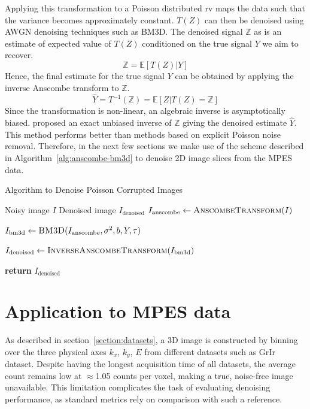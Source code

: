 Applying this transformation to a Poisson distributed \gls{rv} maps the data such that the variance becomes approximately constant. $T(Z)$ can then be denoised using \gls{AWGN} denoising techniques such as \gls{BM3D}. 
The denoised signal $\mathbb{Z}$ as is an estimate of expected value of $T(Z)$ conditioned on the true signal $Y$ we aim to recover.
\begin{equation}
    \mathbb{Z} = \mathbb{E}[T(Z) | Y]
\end{equation}
Hence, the final estimate for the true signal $Y$ can be obtained by applying the inverse Anscombe transform to $\mathbb{Z}$.
\begin{equation}
    \hat{Y} = T^{-1}(\mathbb{Z}) = \mathbb{E}[Z | T(Z) = \mathbb{Z}]
\end{equation}
Since the transformation is non-linear, an algebraic inverse is asymptotically biased. \citeauthor{makitaloOptimalInversionAnscombe2011} \cite{makitaloOptimalInversionAnscombe2011} proposed an exact unbiased inverse of $\mathbb{Z}$ giving the denoised estimate $\hat{Y}$. This method performs better than methods based on explicit Poisson noise removal. Therefore, in the next few sections we make use of the scheme described in Algorithm~\ref{alg:anscombe-bm3d} to denoise 2D image slices from the \gls{MPES} data.

\begin{algorithm}
    \caption{Algorithm to Denoise Poisson Corrupted Images}\label{alg:anscombe-bm3d}
    \begin{algorithmic}[1]
    \Require Noisy image $I$
    \Ensure Denoised image $I_{\text{denoised}}$
    \Statex
        \State $I_{\text{anscombe}} \gets \textsc{AnscombeTransform}(I)$
        
        \State $I_{\text{bm3d}} \gets \textsc{BM3D}(I_{\text{anscombe}}, \sigma^2, b, Y, \tau)$
        
        \State $I_{\text{denoised}} \gets \textsc{InverseAnscombeTransform}(I_{\text{bm3d}})$
        
        \State \textbf{return} $I_{\text{denoised}}$
    \EndProcedure
    \end{algorithmic}
\end{algorithm}

\section{Application to MPES data}
As described in section~\ref{section:datasets}, a 3D image is constructed by binning over the three physical axes $k_x$, $k_y$, $E$ from different datasets such as \gls{GrIr} dataset. Despite having the longest acquisition time of all datasets, the average count remains low at $\approx$1.05 counts per voxel, making a true, noise-free image unavailable. This limitation complicates the task of evaluating denoising performance, as standard metrics rely on comparison with such a reference.


